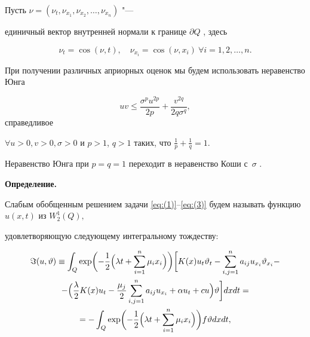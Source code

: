 \smallskip










Пусть  $\nu =({{\nu }_{t}}, {{\nu }_{{{x}_{1}}}}, {{\nu }_{{{x}_{2}}}}, \dots, {{\nu }_{{{x}_{n}}}} )$ "---

единичный вектор внутренней нормали к границе $\partial Q$ \cite{dzhamalov:8,dzhamalov:10}, здесь 

$$ \nu _t=\cos (\nu, t), \quad  \nu_{x_i}=\cos (\nu , {{x}_{i}})~\forall i=1, 2, \dots, n.$$

При получении различных априорных оценок мы будем использовать неравенство Юнга

$$ u   v \le \frac{{{\sigma }^{p}}{{u}^{2p}}}{2p}+\frac{{{v}^{2q}}}{2q{{\sigma }^{q}}},$$  справедливое 

$\forall u >0, v>0,  \sigma >0$  и  $ p>1$, $q>1$ таких, что $\frac{1}{p}+\frac{1}{q}=1$.

Неравенство Юнга при $p=q=1$ переходит в неравенство Коши с~$\sigma $ \cite{dzhamalov:10}.



\smallskip



\textbf{\small\sc Определение.} 

Слабым обобщенным решением задачи \eqref{eq:(1)}--\eqref{eq:(3)} будем называть функцию $u(x,t)$ из  $W_{2}^{1}(Q),$

удовлетворяющую следующему интегральному тождеству: 

\begin{multline}

\Im (u,\vartheta ) \equiv

\int _{Q}

\exp \biggl(-

\frac{1}{2} \Bigl(\lambda t+\sum\limits_{i=1}^{n}{{{\mu }_{i}}{{x}_{i}}} \Bigr) \biggr)

%

\biggl[

K(x){{u}_{t}}{{\vartheta }_{t}}- \sum\limits_{i,j=1}^{n}{{{a}_{ij}}}{{u}_{{{x}_{i}}}}{{\vartheta }_{{{x}_{i}}}}-

\\ 

- \Bigl(

\frac{\lambda }{2}K(x){{u}_{t}}-\frac{{{\mu }_{j}}}{2}\sum\limits_{i,j=1}^{n}{{{a}_{ij}}}{{u}_{{{x}_{i}}}}

  +\alpha {{u}_{t}}+cu \Bigr)\vartheta \biggr]dxdt =

  \\ 

=-\int_{Q} \exp \biggl(-

\frac{1}{2} \Bigl(\lambda t+\sum\limits_{i=1}^{n}{{{\mu }_{i}}{{x}_{i}}} \Bigr) \biggr) f\vartheta dxdt,

\end{multline}

